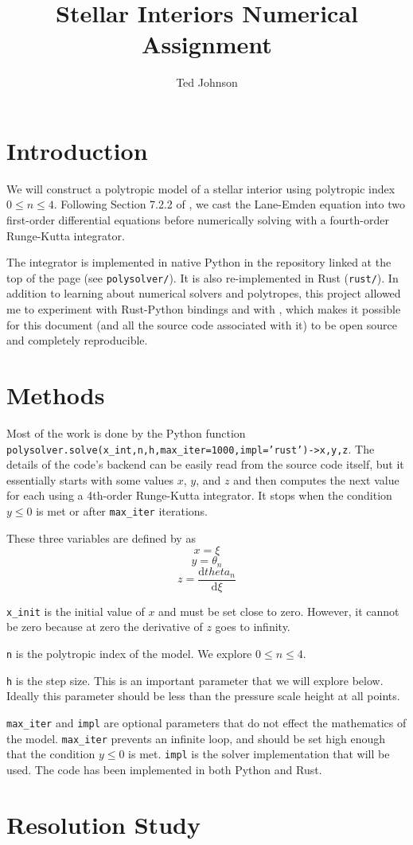\documentclass[twocolumn]{aastex631}
\begin{document}
\title{Stellar Interiors Numerical Assignment}

\author{Ted Johnson}


\section{Introduction}
\label{sec:intro}

We will construct a polytropic model of a stellar interior using
polytropic index $0\le n \le 4$. Following Section 7.2.2 of
\citet{textbook}, we cast the Lane-Emden equation into two
first-order differential equations before numerically solving
with a fourth-order Runge-Kutta integrator.

The integrator is implemented in native Python in the repository
linked at the top of the page (see \texttt{polysolver/}). It is
also re-implemented in Rust (\texttt{rust/}). In addition to
learning about numerical solvers and polytropes, this project
allowed me to experiment with Rust-Python bindings and with
\showyourwork, which makes it possible for this document (and
all the source code associated with it) to be open source and completely
reproducible.


\section{Methods}
\label{sec:methods}
Most of the work is done by the Python function
\texttt{polysolver.solve(x_int,n,h,max_iter=1000,impl='rust')->x,y,z}.
The details of the code's backend can be easily read from
the source code itself, but it essentially starts with some
values $x$, $y$, and $z$ and then computes the next value for
each using a 4th-order Runge-Kutta integrator. It stops when
the condition $y\le 0$ is met or after \texttt{max_iter} iterations.

These three variables are defined by \citet{textbook} as
\[ x = \xi\]
\[y = \theta_n\]
\[z = \frac{\text{d}theta_n}{\text{d}\xi}\]

\texttt{x_init} is the initial value of $x$ and must be set close to zero.
However, it cannot be zero because at zero the derivative of $z$ goes to infinity.

\texttt{n} is the polytropic index of the model. We explore
$0\le n \le 4$.

\texttt{h} is the step size. This is an important parameter that we will
explore below. Ideally this parameter should be less than
the pressure scale height at all points.

\texttt{max_iter} and \texttt{impl} are optional parameters that do not
effect the mathematics of the model. \texttt{max_iter} prevents
an infinite loop, and should be set high enough that the
condition $y\le 0$ is met. \texttt{impl} is the solver
implementation that will be used. The code has been implemented
in both Python and Rust.


\section{Resolution Study}




\end{document}
